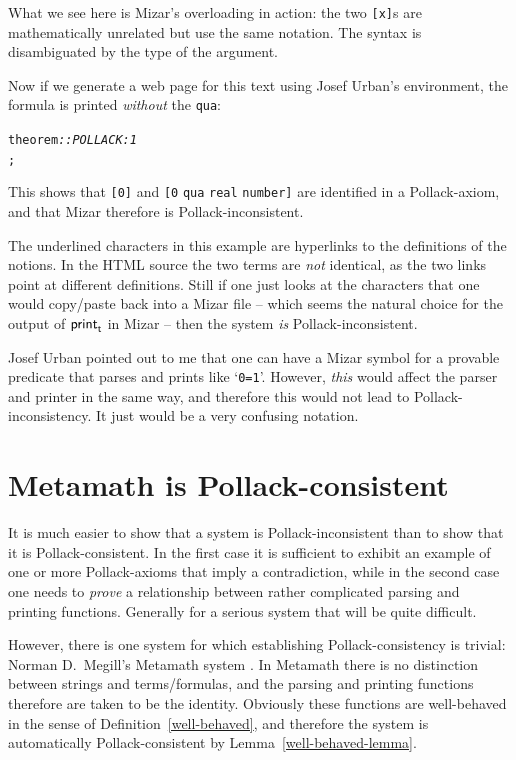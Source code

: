 \documentclass{entcs}
\begin{document}
What we see here is Mizar's overloading in action: the two \texttt{[x]}s are mathematically
unrelated but use the same notation.
The syntax is disambiguated by the
type of the argument.

Now if we generate a web page for this text using Josef Urban's environment,
the formula is printed \emph{without} the \texttt{qua}:

\def\shiftbf#1{\strut\rlap{#1}\hspace{.3pt}#1}
\begin{alltt}
\shiftbf{theorem} \textsl{:: POLLACK:1}
\underbar{[} \underbar{]} \underbar{<>} \underbar{[} \underbar{]} ;
\end{alltt}

\noindent
This shows that \texttt{[0]} and \texttt{[0} \texttt{qua} \texttt{real} \texttt{number]} are identified in a Pollack-axiom, and that Mizar therefore is Pollack-inconsistent.

The underlined characters in this example
are hyperlinks to the definitions of the notions.
In the {\small HTML} source the two terms
are \emph{not} identical, as the two links point at different definitions.
Still if one just looks at the characters that one would copy/paste 
back into a Mizar file -- which seems the natural choice
for the output of ${\sf print}_{\sf t}$ in Mizar -- then the system \emph{is}
Pollack-inconsistent.

Josef Urban pointed out to me that one can have a Mizar symbol 
for a provable predicate that parses and prints like `\texttt{0=1}'.
However, \emph{this} would affect the parser and printer in the same way,
and therefore this would not lead to Pollack-inconsistency.
It just would be a very confusing notation.


\section{Metamath is Pollack-consistent}
\label{Metamath}

It is much easier to show that a system is Pollack-inconsistent
than to show that it is Pollack-consistent.
In the first case it is sufficient to exhibit an example of one or more Pollack-axioms that imply a contradiction,
while in the second case one needs to \emph{prove} a relationship
between rather complicated parsing
and printing functions.
Generally for a serious system that will be quite difficult.

However, there is one system for which establishing Pollack-consistency
is trivial:
Norman D.~Megill's Metamath system \cite{meg:xx,meg:97}.
In Metamath there is no distinction between strings and terms/formulas,
and the parsing and printing functions therefore are taken to be the identity.
Obviously these functions are well-behaved in the sense
of Definition~\ref{well-behaved}, and therefore
the system is automatically Pollack-consistent by Lemma~\ref{well-behaved-lemma}.
\end{document}
